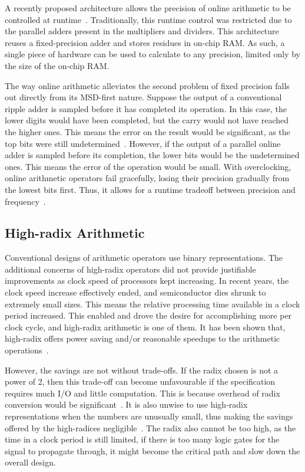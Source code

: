 A recently proposed architecture allows the precision of online arithmetic to be controlled at runtime~\cite{Zhao1}.
Traditionally, this runtime control was restricted due to the parallel adders present in the multipliers and dividers.
This architecture reuses a fixed-precision adder and stores residues in on-chip RAM.
As such, a single piece of hardware can be used to calculate to any precision, limited only by the size of the on-chip RAM.

The way online arithmetic alleviates the second problem of fixed precision falls out directly from its MSD-first nature.
Suppose the output of a conventional ripple adder is sampled before it has completed its operation.
In this case, the lower digits would have been completed, but the carry would not have reached the higher ones.
This means the error on the result would be significant, as the top bits were still undetermined~\cite{Shi1}.
However, if the output of a parallel online adder is sampled before its completion, the lower bits would be the undetermined ones.
This means the error of the operation would be small.
With overclocking, online arithmetic operators fail gracefully, losing their precision gradually from the lowest bits first.
Thus, it allows for a runtime tradeoff between precision and frequency~\cite{Shi2}.

\subsection{High-radix Arithmetic}
Conventional designs of arithmetic operators use binary representations.
The additional concerns of high-radix operators did not provide justifiable improvements as clock speed of processors kept increasing.
In recent years, the clock speed increase effectively ended, and semiconductor dies shrunk to extremely small sizes.
This means the relative processing time available in a clock period increased.
This enabled and drove the desire for accomplishing more per clock cycle, and high-radix arithmetic is one of them.
It has been shown that, high-radix offers power saving and/or reasonable speedups to the arithmetic operations~\cite{Catanzaro1}\cite{Amin1}\cite{Chen1}.

However, the savings are not without trade-offs.
If the radix chosen is not a power of 2, then this trade-off can become unfavourable if the specification requires much I/O and little computation.
This is because overhead of radix conversion would be significant~\cite{Whyte1}.
It is also unwise to use high-radix representations when the numbers are unusually small, thus making the savings offered by the high-radices negligible~\cite{Catanzaro1}.
The radix also cannot be too high, as the time in a clock period is still limited, if there is too many logic gates for the signal to propagate through, it might become the critical path and slow down the overall design.


